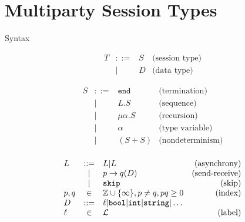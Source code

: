 \section{Multiparty Session Types}

\begin{frame}{Syntax}
  \begin{figure}[ht]
    $$\begin{array}{lclr}
        T & ::= & S & \text{(session type)} \\
          & |   & D & \text{(data type)}
      \end{array}$$

    \begin{center}
      \begin{minipage}{0.45\textwidth}
        $$\begin{array}{lclr}
            S & ::= & \texttt{end} & \text{(termination)}    \\
              & |   & L.S          & \text{(sequence)}       \\
              & |   & \mu\alpha.S  & \text{(recursion)}      \\
              & |   & \alpha       & \text{(type variable)}  \\
              & |   & (S+S)        & \text{(nondeterminism)} \\
          \end{array}$$
      \end{minipage}
      \hfill
      \begin{minipage}{0.53\textwidth}
        $$\begin{array}{lclr}
            L    & ::= & L | L                                                         & \text{(asynchrony)}   \\
                 & |   & p\rightarrow q(D)                                             & \text{(send-receive)} \\
                 & |   & \texttt{skip}                                                 & \text{(skip)}         \\
            p,q  & \in & \mathbb{Z}\cup\{\infty\}, p\ne q, pq\ge 0                            & \text{(index)}        \\
            D    & ::= & \ell | \texttt{bool} | \texttt{int} | \texttt{string} |\ldots &                       \\
            \ell & \in & \mathcal{L}                                                            & \text{(label)}        \\
          \end{array}$$
      \end{minipage}
    \end{center}
    \label{syntax}
  \end{figure}
\end{frame}

